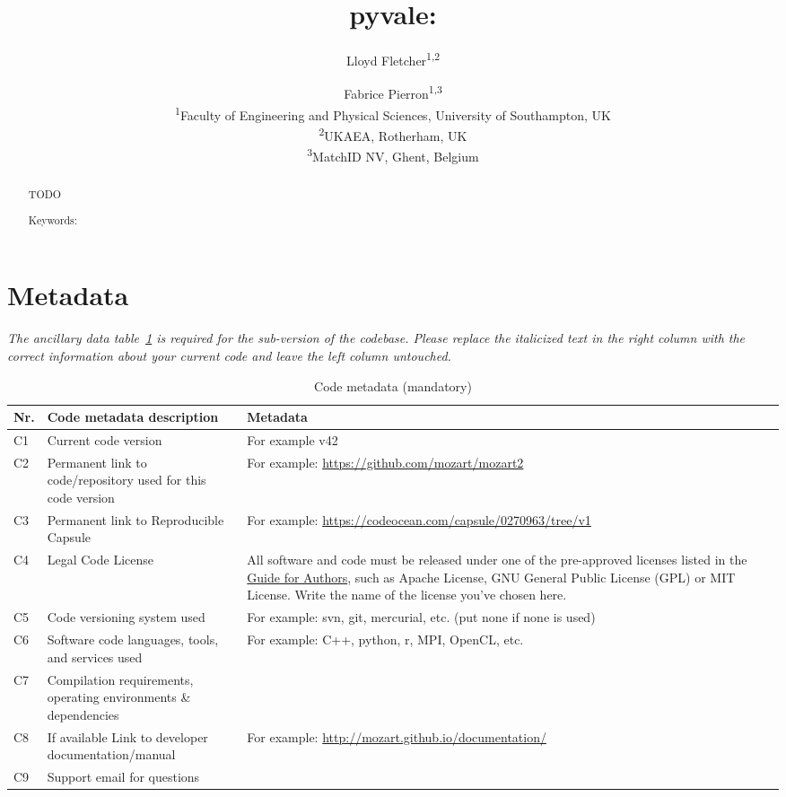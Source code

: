 \documentclass[11pt, a4paper, oneside, onecolumn]{article}
\title{pyvale: }
\author{Lloyd Fletcher\textsuperscript{1,2} \and Fabrice Pierron\textsuperscript{1,3}\\
\textsuperscript{1}Faculty of Engineering and Physical Sciences, University of Southampton, UK \\
\textsuperscript{2}UKAEA, Rotherham, UK \\
\textsuperscript{3}MatchID NV, Ghent, Belgium \\
}
\date{}
\begin{document}
\maketitle

\begin{abstract}
TODO

Keywords: 
\end{abstract}

\section*{Metadata}
\label{}
\textit{The ancillary data table~\ref{codeMetadata} is required for the sub-version of the codebase. Please replace the italicized text in the right column with the correct information about your current code and leave the left column untouched.}

\begin{table}[!h]
\begin{tabular}{|l|p{6.5cm}|p{6.5cm}|}
\hline
\textbf{Nr.} & \textbf{Code metadata description} & \textbf{Metadata} \\
\hline
C1 & Current code version & For example v42 \\
\hline
C2 & Permanent link to code/repository used for this code version & For example: \url{https://github.com/mozart/mozart2} \\
\hline
C3  & Permanent link to Reproducible Capsule & For example: \url{https://codeocean.com/capsule/0270963/tree/v1}\\
\hline
C4 & Legal Code License   & All software and code must be released under one of the pre-approved licenses listed in the \href{https://www.elsevier.com/journals/softwarex/2352-7110/guide-for-authors}{Guide for Authors}, such as Apache License, GNU General Public License (GPL) or MIT License. Write the name of the license you’ve chosen here. \\
\hline
C5 & Code versioning system used & For example: svn, git, mercurial,
                                   etc. (put none if none is used) \\
\hline
C6 & Software code languages, tools, and services used & For example: C++, python, r, MPI, OpenCL, etc. \\
\hline
C7 & Compilation requirements, operating environments \& dependencies & \\
\hline
C8 & If available Link to developer documentation/manual & For example: \url{http://mozart.github.io/documentation/} \\
\hline
C9 & Support email for questions & \\
\hline
\end{tabular}
\caption{Code metadata (mandatory)}
\label{codeMetadata} 
\end{table}
\end{document}
